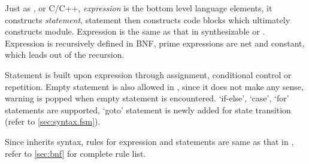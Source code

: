 Just as \vlog{}, \sv{} or C/C++, \emph{expression}
is the bottom level language elements, it
constructs \emph{statement}, statement then
constructs code blocks which ultimately constructs
module. Expression is the same as that in synthesizable \vlog{}
or \sv{}. Expression is recursively defined in BNF, prime expressions
are net and constant, which leads out of the recursion.

Statement is built upon expression through assignment, conditional
control or repetition. Empty statement is also allowed in \mhdl{},
since it does not make any sense, warning is popped when empty
statement is encountered. `if-else', `case', `for' statements are
supported, `goto' statement is newly added for state transition (refer
to \autoref{sec:syntax.fsm}).

Since \mhdl{} inherits \sv{} syntax, rules for expression and
statements are same as that in \sv{}, refer to \autoref{sec:bnf} for
complete rule list. 
